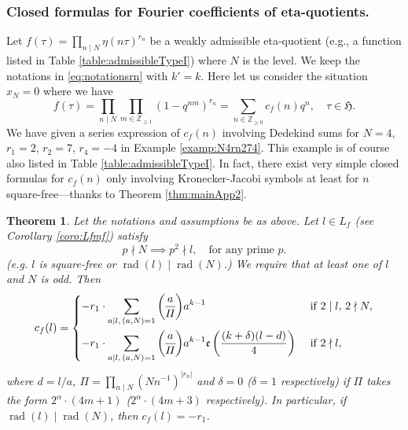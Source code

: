 \documentclass[12pt]{amsart}
\numberwithin{equation}{section}
\theoremstyle{plain}
\newtheorem{thm}{Theorem}[section]
\theoremstyle{definition}
\theoremstyle{remark}
\newcommand\legendre[2]{\genfrac{(}{)}{}{}{#1}{#2}}
\newcommand*\abs[1]{\lvert#1\rvert}
\newcommand\etp[1]{\mathfrak{e}\left(#1\right)}
\newcommand\rad{\mathop{\mathrm{rad}}}
\newcommand\numgeq[2]{\mathbb{#1}_{\geq #2}}
\newcommand\uhp{\mathfrak{H}}
\begin{document}
\subsubsection{Closed formulas for Fourier coefficients of eta-quotients.}\label{subsuesec:closedFourier} Let $f(\tau)=\prod_{n\mid N}\eta(n\tau)^{r_n}$ be a weakly admissible eta-quotient (e.g., a function listed in Table \ref{table:admissibleTypeI}) where $N$ is the level. We keep the notations in \eqref{eq:notationsrn} with $k'=k$. Here let us consider the situation $x_N=0$ where we have
\begin{equation*}
f(\tau)=\prod_{n\mid N}\prod_{m\in\numgeq{Z}{1}}(1-q^{nm})^{r_n}=\sum_{n\in\numgeq{Z}{0}}c_f(n)q^n,\quad\tau\in\uhp.
\end{equation*}
We have given a series expression of $c_f(n)$ involving Dedekind sums for $N=4$, $r_1=2$, $r_2=7$, $r_4=-4$ in Example \ref{examp:N4rn274}. This example is of course also listed in Table \ref{table:admissibleTypeI}. In fact, there exist very simple closed formulas for $c_f(n)$ only involving Kronecker-Jacobi symbols at least for $n$ square-free---thanks to Theorem \ref{thm:mainApp2}.
\begin{thm}
\label{thm:closedFormulaclf}
Let the notations and assumptions be as above. Let $l\in L_f$ (see Corollary \ref{coro:Lfmf}) satisfy
\begin{equation}
\label{eq:pnp2l}
p\nmid N\implies p^2\nmid l,\quad\text{for any prime } p.
\end{equation}
(e.g. $l$ is square-free or $\rad(l)\mid\rad(N)$.) We require that at least one of $l$ and $N$ is odd. Then
\begin{equation*}
c_f(l)=\begin{dcases}
-r_1\cdot\sum_{a\mid l,\,(a,N)=1}\legendre{a}{\varPi}a^{k-1} &\text{ if } 2\mid l,\,2\nmid N,\\
-r_1\cdot\sum_{a\mid l,\,(a,N)=1}\legendre{a}{\varPi}a^{k-1}\etp{\frac{(k+\delta)(l-d)}{4}} &\text{ if } 2\nmid l,
\end{dcases}
\end{equation*}
where $d=l/a$, $\varPi=\prod_{n\mid N}(Nn^{-1})^{\abs{r_n}}$ and $\delta=0$ ($\delta=1$ respectively) if $\varPi$ takes the form $2^\alpha\cdot(4m+1)$ ($2^\alpha\cdot(4m+3)$ respectively). In particular, if $\rad(l)\mid\rad(N)$, then $c_f(l)=-r_1$.
\end{thm}
\end{document}
